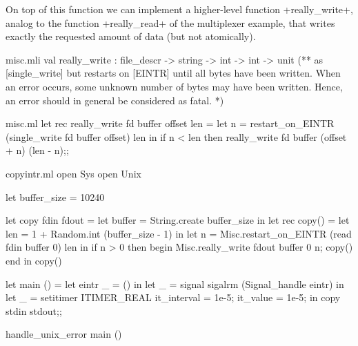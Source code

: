On top of this function we can implement a higher-level function
\ml+really_write+, analog to the function \ml+really_read+ of the
multiplexer example, that writes exactly the requested amount of data
(but not atomically).
%
\begin{codefile}{misc.mli}
val really_write : file_descr -> string -> int -> int -> unit
(** as [single_write] but restarts on [EINTR] until all bytes have been
written. When an error occurs, some unknown number of bytes may have been
written. Hence, an error should in general be considered as fatal. *)
\end{codefile}
%
\begin{listingcodefile}{misc.ml}
let rec really_write fd buffer offset len =
  let n = restart_on_EINTR (single_write fd buffer offset) len in
  if n < len then really_write fd buffer (offset + n) (len - n);;
\end{listingcodefile}
%
\begin{codefile}{copyintr.ml}
open Sys
open Unix

let buffer_size = 10240

let copy fdin fdout = 
  let buffer = String.create buffer_size in
  let rec copy()  =
    let len = 1 + Random.int (buffer_size - 1) in
    let n = Misc.restart_on_EINTR (read fdin buffer 0) len in
    if n > 0 then
      begin
        Misc.really_write fdout buffer 0 n;
        copy()
      end in
  copy()

let main () =
  let eintr _ = () in
  let _ = signal sigalrm (Signal_handle eintr) in
  let _ = setitimer ITIMER_REAL { it_interval = 1e-5; it_value = 1e-5; } in
  copy stdin stdout;;

handle_unix_error main ()
\end{codefile}
%

